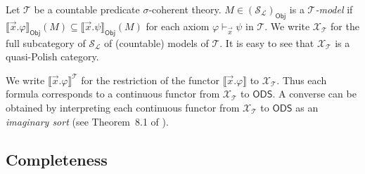 \documentclass{article}
\theoremstyle{plain}
\def\cal#1{{\mathcal #1}}
\def\calL{{\cal L}}
\def\calS{{\cal S}}
\def\calT{{\cal T}}
\def\calX{{\cal X}}
\newcommand{\ODS}{{\mathsf{ODS}}}
\newcommand{\Obj}{\mathsf{Obj}}
\begin{document}
Let $\calT$ be a countable predicate $\sigma$-coherent theory. $M\in (\calS_\calL)_\Obj$ is a \emph{$\calT$-model} if $\llbracket \vec{x}.\varphi \rrbracket_\Obj(M) \subseteq \llbracket \vec{x}.\psi \rrbracket_\Obj(M)$ for each axiom $\varphi \vdash_{\vec{x}} \psi$ in $\calT$. We write $\calX_\calT$ for the full subcategory of $\calS_\calL$ of (countable) models of $\calT$. It is easy to see that $\calX_\calT$ is a quasi-Polish category.


We write $\llbracket \vec{x}.\varphi \rrbracket^{\calT}$ for the restriction of the functor $\llbracket \vec{x}.\varphi \rrbracket$ to $\calX_\calT$. Thus each formula corresponds to a continuous functor from $\calX_\calT$ to $\ODS$. A converse can be obtained by interpreting each continuous functor from $\calX_\calT$ to $\ODS$ as an \emph{imaginary sort} (see Theorem~8.1 of \cite{Chen19}).


\subsection{Completeness}
\end{document}
